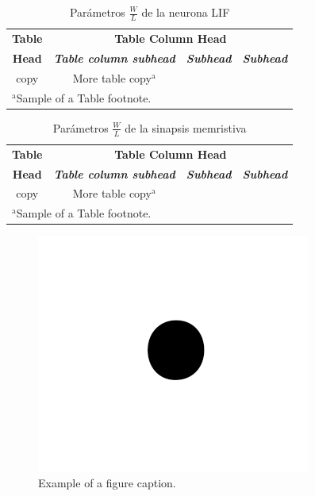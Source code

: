 \documentclass[conference]{IEEEtran}
\begin{document}
\begin{table}[htbp]
\caption{Parámetros $\frac{W}{L}$ de la neurona LIF}
\begin{center}
\begin{tabular}{|c|c|c|c|}
\hline
\textbf{Table}&\multicolumn{3}{|c|}{\textbf{Table Column Head}} \\
\cline{2-4} 
\textbf{Head} & \textbf{\textit{Table column subhead}}& \textbf{\textit{Subhead}}& \textbf{\textit{Subhead}} \\
\hline
copy& More table copy$^{\mathrm{a}}$& &  \\
\hline
\multicolumn{4}{l}{$^{\mathrm{a}}$Sample of a Table footnote.}
\end{tabular}
\label{tab1}
\end{center}
\end{table}

\begin{table}[htbp]
\caption{Parámetros $\frac{W}{L}$ de la sinapsis memristiva}
\begin{center}
\begin{tabular}{|c|c|c|c|}
\hline
\textbf{Table}&\multicolumn{3}{|c|}{\textbf{Table Column Head}} \\
\cline{2-4} 
\textbf{Head} & \textbf{\textit{Table column subhead}}& \textbf{\textit{Subhead}}& \textbf{\textit{Subhead}} \\
\hline
copy& More table copy$^{\mathrm{a}}$& &  \\
\hline
\multicolumn{4}{l}{$^{\mathrm{a}}$Sample of a Table footnote.}
\end{tabular}
\label{tab1}
\end{center}
\end{table}

\begin{figure}[htbp]
\centerline{\includegraphics{fig1.png}}
\caption{Example of a figure caption.}
\label{fig}
\end{figure}
\end{document}
